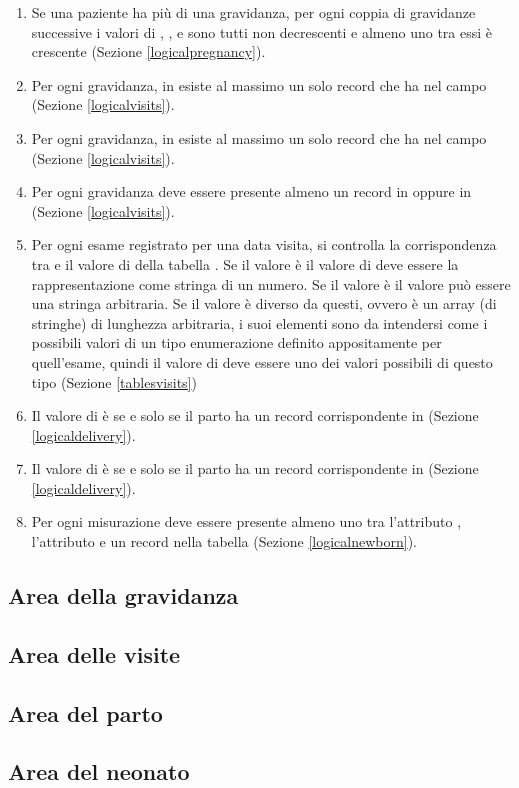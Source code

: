 \begin{enumerate}
\item Se una paziente ha più di una gravidanza, per ogni coppia di gravidanze successive i valori di , ,  e  sono tutti non decrescenti e almeno uno tra essi è crescente (Sezione \ref{logicalpregnancy}).
\item Per ogni gravidanza, in  esiste al massimo un solo record che ha  nel campo  (Sezione \ref{logicalvisits}).
\item Per ogni gravidanza, in  esiste al massimo un solo record che ha  nel campo  (Sezione \ref{logicalvisits}).
\item Per ogni gravidanza deve essere presente almeno un record in  oppure in  (Sezione \ref{logicalvisits}).
\item Per ogni esame registrato per una data visita, si controlla la corrispondenza tra  e il valore di  della tabella . Se il valore è  il valore di  deve essere la rappresentazione come stringa di un numero. Se il valore è  il valore può essere una stringa arbitraria. Se il valore è diverso da questi, ovvero è un array (di stringhe) di lunghezza arbitraria, i suoi elementi sono da intendersi come i possibili valori di un tipo enumerazione definito appositamente per quell'esame, quindi il valore di  deve essere uno dei valori possibili di questo tipo (Sezione \ref{tablesvisits})
\item Il valore di  è  se e solo se il parto ha un record corrispondente in  (Sezione \ref{logicaldelivery}).
\item Il valore di  è  se e solo se il parto ha un record corrispondente in  (Sezione \ref{logicaldelivery}).
\item Per ogni misurazione deve essere presente almeno uno tra l'attributo , l'attributo  e un record nella tabella  (Sezione \ref{logicalnewborn}).
\end{enumerate}

\subsection{Area della gravidanza}
\label{triggerspregnancy}

\subsection{Area delle visite}
\label{triggersvisits}

\subsection{Area del parto}
\label{triggersdelivery}

\subsection{Area del neonato}
\label{triggersnewborn}